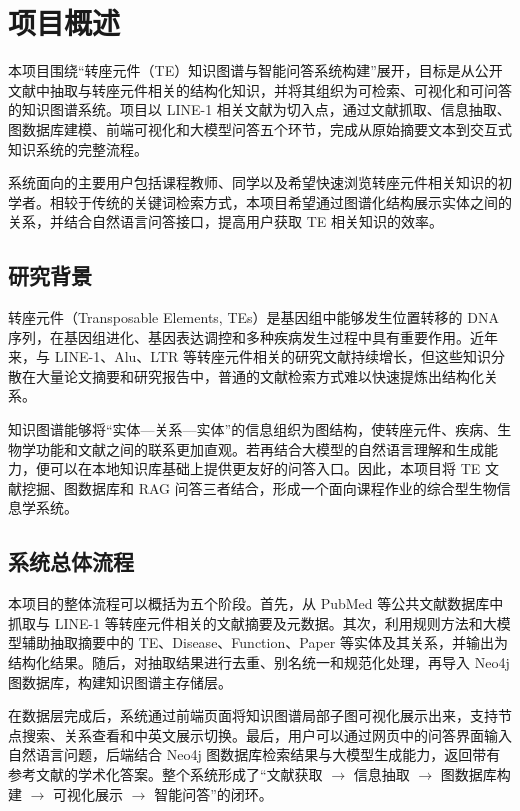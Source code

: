 \section{项目概述}

本项目围绕“转座元件（TE）知识图谱与智能问答系统构建”展开，目标是从公开文献中抽取与转座元件相关的结构化知识，并将其组织为可检索、可视化和可问答的知识图谱系统。项目以 LINE-1 相关文献为切入点，通过文献抓取、信息抽取、图数据库建模、前端可视化和大模型问答五个环节，完成从原始摘要文本到交互式知识系统的完整流程。

系统面向的主要用户包括课程教师、同学以及希望快速浏览转座元件相关知识的初学者。相较于传统的关键词检索方式，本项目希望通过图谱化结构展示实体之间的关系，并结合自然语言问答接口，提高用户获取 TE 相关知识的效率。

\subsection{研究背景}

转座元件（Transposable Elements, TEs）是基因组中能够发生位置转移的 DNA 序列，在基因组进化、基因表达调控和多种疾病发生过程中具有重要作用。近年来，与 LINE-1、Alu、LTR 等转座元件相关的研究文献持续增长，但这些知识分散在大量论文摘要和研究报告中，普通的文献检索方式难以快速提炼出结构化关系。

知识图谱能够将“实体—关系—实体”的信息组织为图结构，使转座元件、疾病、生物学功能和文献之间的联系更加直观。若再结合大模型的自然语言理解和生成能力，便可以在本地知识库基础上提供更友好的问答入口。因此，本项目将 TE 文献挖掘、图数据库和 RAG 问答三者结合，形成一个面向课程作业的综合型生物信息学系统。

\subsection{系统总体流程}

本项目的整体流程可以概括为五个阶段。首先，从 PubMed 等公共文献数据库中抓取与 LINE-1 等转座元件相关的文献摘要及元数据。其次，利用规则方法和大模型辅助抽取摘要中的 TE、Disease、Function、Paper 等实体及其关系，并输出为结构化结果。随后，对抽取结果进行去重、别名统一和规范化处理，再导入 Neo4j 图数据库，构建知识图谱主存储层。

在数据层完成后，系统通过前端页面将知识图谱局部子图可视化展示出来，支持节点搜索、关系查看和中英文展示切换。最后，用户可以通过网页中的问答界面输入自然语言问题，后端结合 Neo4j 图数据库检索结果与大模型生成能力，返回带有参考文献的学术化答案。整个系统形成了“文献获取 $\rightarrow$ 信息抽取 $\rightarrow$ 图数据库构建 $\rightarrow$ 可视化展示 $\rightarrow$ 智能问答”的闭环。


